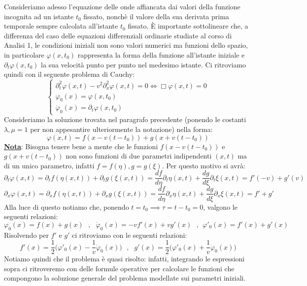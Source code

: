 \documentclass[a4paper,12pt]{report}
\begin{document}
Consideriamo adesso l'equazione delle onde affiancata dai valori della funzione incognita ad un istante $t_0$ fissato, nonchè il valore della sua derivata prima temporale sempre calcolata all'istante $t_0$ fissato. È importante sottolineare che, a differenza del caso delle equazioni differenziali ordinarie studiate al corso di Analisi 1, le condizioni iniziali non sono valori numerici ma funzioni dello spazio, in particolare $\varphi (x,t_0)$ rappresenta la forma della funzione all'istante iniziale e $\partial_t\varphi(x,t_0)$ la sua velocità punto per punto nel medesimo istante. Ci ritroviamo quindi con il seguente problema di Cauchy:
\[\begin{cases}
    \partial_t^2\varphi(x,t)-v^2\partial_x^2\varphi(x,t)=0\iff \Box\varphi(x,t)=0
    \\ \varphi_0(x)=\varphi(x,t_0)
    \\ \dot{\varphi}_0(x)=\partial_t\varphi(x,t_0)
\end{cases}\]
Consideriamo la soluzione trovata nel paragrafo precedente (ponendo le costanti $\lambda,\mu=1$ per non appesantire ulteriormente la notazione) nella forma:
\[\varphi(x,t)=f(x-v(t-t_0))+g(x+v(t-t_0))\]
\underline{\textbf{Nota}}: Bisogna tenere bene a mente che le funzioni $f(x-v(t-t_0))$ e $g(x+v(t-t_0))$ non sono funzioni di due parametri indipendenti $(x,t)$ ma di un unico parametro, infatti $f=f(\eta), g=g(\xi)$. Per questo motivo si avrà: 
\[\partial_t\varphi(x,t)=\partial_tf(\eta(x,t))+\partial_tg(\xi(x,t))=\displaystyle\frac{df}{d\eta}\partial_t\eta(x,t)+\frac{dg}{d\xi}\partial_t\xi(x,t)=f'(-v)+g'(v)
\]
\[\partial_x\varphi(x,t)=\partial_xf(\eta(x,t))+\partial_xg(\xi(x,t))=\displaystyle\frac{df}{d\eta}\partial_x\eta(x,t)+\frac{dg}{d\xi}\partial_x\xi(x,t)=f'+g'\]
Alla luce di questo notiamo che, ponendo $t=t_0\implies \tau=t-t_0=0$, valgono le seguenti relazioni:
\[\varphi_0(x)=f(x)+g(x) \ \ \ ,\ \ \ \dot{\varphi}_0(x)=-vf'(x)+vg'(x)\ \ \ , \ \ \varphi'_0(x)=f'(x)+g'(x)\]
Risolvendo per $f'$ e $g'$ ci ritroviamo con le seguenti relazioni:
\[f'(x)=\displaystyle\frac{1}{2}\bigg(\varphi'_0(x)-\frac{1}{v}\dot{\varphi}_0(x)\bigg)\ \ \ , \ \ \ g'(x)=\frac{1}{2}\bigg(\varphi'_0(x)+\frac{1}{v}\dot{\varphi}_0(x)\bigg) \]
Notiamo quindi che il problema è quasi risolto: infatti, integrando le espressioni sopra ci ritroveremo con delle formule operative per calcolare le funzioni che compongono la soluzione generale del problema modellate sui parametri iniziali.

\newpage
\end{document}
